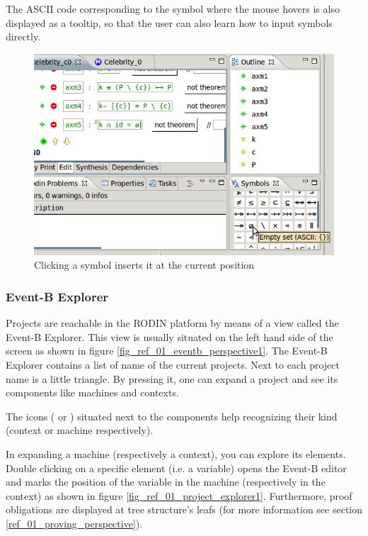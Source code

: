 The ASCII code corresponding to the symbol where the mouse hovers is also displayed as a tooltip, so that the user can also learn how to input symbols directly. 

\begin{figure}[!h]
\begin{center}
	\includegraphics{img/reference/ref_01_symbol_table1.png}
	\caption{Clicking a symbol inserts it at the current position}
	\label{fig_ref_01_symbol_table1}
\end{center}
\end{figure}

\subsubsection{Event-B Explorer}
\label{reference_01_eventb_explorer}

Projects are reachable in the RODIN platform by means of a view called the \textsf{Event-B Explorer}. This view is usually situated on the left hand side of the screen as shown in figure \ref{fig_ref_01_eventb_perspective1}. The \textsf{Event-B Explorer} contains a list of name of the current projects. Next to each project name is a little triangle. By pressing it, one can expand a project and see its components like machines and contexts.

The icons ( or ) situated next to the components help recognizing their kind (context or machine respectively).

In expanding a machine (respectively a context), you can explore its elements. Double clicking on a specific element (i.e. a variable) opens the Event-B editor and marks the position of the variable in the machine (respectively in the context) as shown in figure \ref{fig_ref_01_project_explorer1}. Furthermore, proof obligations are displayed at tree structure's leafs (for more information see section \ref{ref_01_proving_perspective}).

